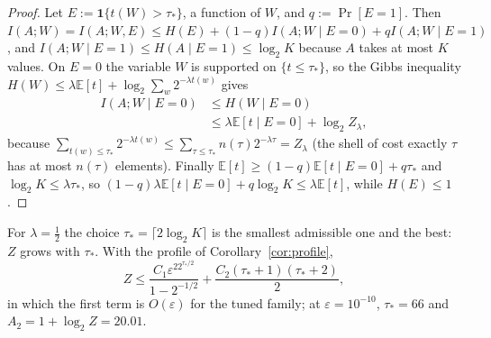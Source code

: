 \documentclass[aps,prx,twocolumn,superscriptaddress,nofootinbib,longbibliography]{revtex4-2}
\theoremstyle{plain}
\theoremstyle{definition}
\theoremstyle{remark}
\newcommand{\E}{\mathbb{E}}
\begin{document}
\begin{proof}
Let $E:=\mathbf1\{t(W)>\tau_*\}$, a function of $W$, and $q:=\Pr[E=1]$. Then $I(A;W)=I(A;W,E)\le H(E)+(1-q)I(A;W\mid E=0)+qI(A;W\mid E=1)$, and $I(A;W\mid E=1)\le H(A\mid E=1)\le\log_2K$ because $A$ takes at most $K$ values. On $E=0$ the variable $W$ is supported on $\{t\le\tau_*\}$, so the Gibbs inequality $H(W)\le\lambda\E[t]+\log_2\sum_w2^{-\lambda t(w)}$ gives
\[\begin{aligned}I(A;W\mid E=0)&\le H(W\mid E=0)\\&\le\lambda\E[t\mid E=0]+\log_2Z_\lambda,\end{aligned}\]
because $\sum_{t(w)\le\tau_*}2^{-\lambda t(w)}\le\sum_{\tau\le\tau_*}n(\tau)2^{-\lambda\tau}=Z_\lambda$ (the shell of cost exactly $\tau$ has at most $n(\tau)$ elements). Finally $\E[t]\ge(1-q)\E[t\mid E=0]+q\tau_*$ and $\log_2K\le\lambda\tau_*$, so $(1-q)\lambda\E[t\mid E=0]+q\log_2K\le\lambda\E[t]$, while $H(E)\le1$.
\end{proof}
For $\lambda=\tfrac12$ the choice $\tau_*=\lceil2\log_2K\rceil$ is the smallest admissible one and the best: $Z$ grows with $\tau_*$. With the profile of Corollary~\ref{cor:profile},
\begin{equation}
Z\le\frac{C_1\varepsilon^22^{\tau_*/2}}{1-2^{-1/2}}+\frac{C_2(\tau_*+1)(\tau_*+2)}2,
\end{equation}
in which the first term is $O(\varepsilon)$ for the tuned family; at $\varepsilon=10^{-10}$, $\tau_*=66$ and $A_2=1+\log_2Z=20.01$.
\end{document}

